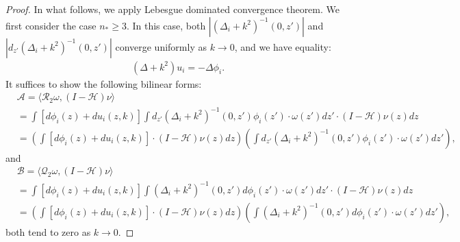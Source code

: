 \documentclass[12pt]{amsart}
\begin{document}
\begin{proof}

In what follows, we apply Lebesgue dominated convergence theorem. We first consider the case $n_*\ge 3$. In this case, both $|(\Delta_i+k^2)^{-1}(0,z')|$ and $|d_{z'}(\Delta_i+k^2)^{-1}(0,z')|$ converge uniformly as $k\to 0$, and we have equality:
\begin{align*}
    (\Delta+k^2)u_i = -\Delta \phi_i.
\end{align*}
It suffices to show the following bilinear forms:
\begin{align}\label{A}
    &\mathcal{A} =\langle \mathcal{R}_2\omega, (I-\mathcal{H})\nu \rangle \\ \nonumber
    &=\int \left[ d\phi_i(z) + du_i(z,k) \right] \int d_{z'}(\Delta_i+k^2)^{-1}(0,z') \phi_i(z') \cdot \omega(z') dz' \cdot (I-\mathcal{H})\nu(z) dz\\ \nonumber
    &= \left(\int \left[ d\phi_i(z) + du_i(z,k) \right] \cdot (I-\mathcal{H})\nu(z) dz \right) \left(\int d_{z'}(\Delta_i+k^2)^{-1}(0,z') \phi_i(z') \cdot \omega(z') dz' \right),
\end{align}
and
\begin{align}\label{B}
    &\mathcal{B} = \langle \mathcal{Q}_2 \omega, (I-\mathcal{H})\nu \rangle \\ \nonumber
    &= \int \left[ d\phi_i(z) + du_i(z,k) \right] \int (\Delta_i+k^2)^{-1}(0,z') d\phi_i(z') \cdot \omega(z') dz' \cdot (I-\mathcal{H})\nu(z) dz\\ \nonumber
    &= \left(\int \left[ d\phi_i(z) + du_i(z,k) \right] \cdot (I-\mathcal{H})\nu(z) dz \right) \left(\int (\Delta_i+k^2)^{-1}(0,z') d\phi_i(z') \cdot \omega(z') dz' \right),
\end{align}
both tend to zero as $k\to 0$. 


\end{proof}
\end{document}
